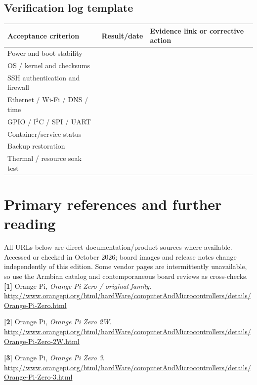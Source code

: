 \documentclass[10pt,oneside,openany]{report}
\begin{document}
\section{Verification log template}
\begin{center}\small\begin{tabularx}{\textwidth}{@{}>{\raggedright\arraybackslash}p{4.0cm}>{\raggedright\arraybackslash}p{2.5cm}>{\raggedright\arraybackslash}X@{}}\toprule
\textbf{Acceptance criterion} & \textbf{Result/date} & \textbf{Evidence link or corrective action}\\\midrule
Power and boot stability & & \\[1.1ex]
OS / kernel and checksums & & \\[1.1ex]
SSH authentication and firewall & & \\[1.1ex]
Ethernet / Wi-Fi / DNS / time & & \\[1.1ex]
GPIO / I\(^{2}\)C / SPI / UART & & \\[1.1ex]
Container/service status & & \\[1.1ex]
Backup restoration & & \\[1.1ex]
Thermal / resource soak test & & \\[1.1ex]
\bottomrule\end{tabularx}\end{center}

\chapter{Primary references and further reading}
\noindent All URLs below are direct documentation/product sources where available. Accessed or checked in October 2026; board images and release notes change independently of this edition. Some vendor pages are intermittently unavailable, so use the Armbian catalog and contemporaneous board reviews as cross-checks.
\begingroup\footnotesize\setlength{\parskip}{2pt}
\noindent\textbf{[1]} Orange Pi, \emph{Orange Pi Zero / original family}. \url{http://www.orangepi.org/html/hardWare/computerAndMicrocontrollers/details/Orange-Pi-Zero.html}

\noindent\textbf{[2]} Orange Pi, \emph{Orange Pi Zero 2W}. \url{http://www.orangepi.org/html/hardWare/computerAndMicrocontrollers/details/Orange-Pi-Zero-2W.html}

\noindent\textbf{[3]} Orange Pi, \emph{Orange Pi Zero 3}. \url{http://www.orangepi.org/html/hardWare/computerAndMicrocontrollers/details/Orange-Pi-Zero-3.html}
\end{document}
